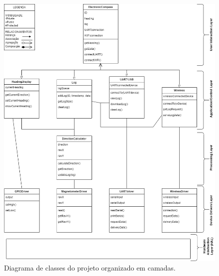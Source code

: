 \documentclass[10pt,twocolumn,letterpaper]{article}
\begin{document}

\onecolumn
{}
\label{apendice-a}
\begin{figure}[h]
  \centering
  \includegraphics[keepaspectratio=true,scale=0.44]{figures/Diagrama_Classe_Projeto_Final.png}
  \caption{Diagrama de classes do projeto organizado em camadas.}
  \label{fig:diagrama-classes}
\end{figure}

\end{document}
